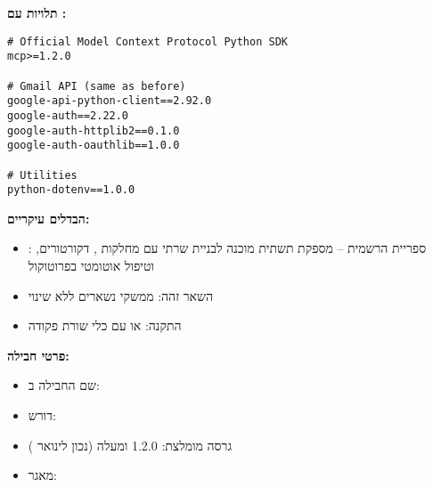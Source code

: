 
\textbf{תלויות  עם :}

\begin{english}
\begin{verbatim}
# Official Model Context Protocol Python SDK
mcp>=1.2.0

# Gmail API (same as before)
google-api-python-client==2.92.0
google-auth==2.22.0
google-auth-httplib2==0.1.0
google-auth-oauthlib==1.0.0

# Utilities
python-dotenv==1.0.0
\end{verbatim}
\end{english}

\textbf{הבדלים עיקריים:}

\begin{itemize}
\item {}: ספריית  הרשמית – מספקת תשתית מוכנה לבניית שרתי  עם מחלקות , דקורטורים, וטיפול אוטומטי בפרוטוקול
\item השאר זהה: ממשקי  נשארים ללא שינוי
\item התקנה:  או  עם כלי שורת פקודה
\end{itemize}

\textbf{פרטי חבילה:}

\begin{itemize}
\item שם החבילה ב: 
\item דורש: 
\item גרסה מומלצת: \num{1.2.0} ומעלה (נכון לינואר )
\item מאגר: 
\end{itemize}

